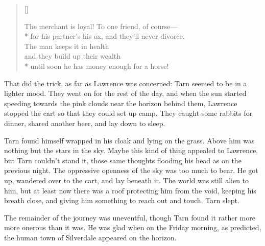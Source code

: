 \begin{verse}[\versewidth]
\begin{patverse*}
The merchant is loyal!  To one friend, of course---\\*
for his partner's his ox, and they'll never divorce.\\
The man keeps it in health\\
and they build up their wealth\\*
until soon he has money enough for a horse!
\end{patverse*}
\end{verse}

That did the trick, as far as Lawrence was concerned: Tarn seemed to be in a lighter mood.  They went on for the rest of the day, and when the sun started speeding towards the pink clouds near the horizon behind them, Lawrence stopped the cart so that they could set up camp.  They caught some rabbits for dinner, shared another beer, and lay down to sleep.

Tarn found himself wrapped in his cloak and lying on the grass.  Above him was nothing but the stars in the sky.  Maybe this kind of thing appealed to Lawrence, but Tarn couldn't stand it, those same thoughts flooding his head as on the previous night.  The oppressive openness of the sky was too much to bear.  He got up, wandered over to the cart, and lay beneath it.  The world was still alien to him, but at least now there was a roof protecting him from the void, keeping his breath close, and giving him something to reach out and touch.  Tarn slept.

The remainder of the journey was uneventful, though Tarn found it rather more more onerous than it was.  He was glad when on the Friday morning, as predicted, the human town of Silverdale appeared on the horizon.
